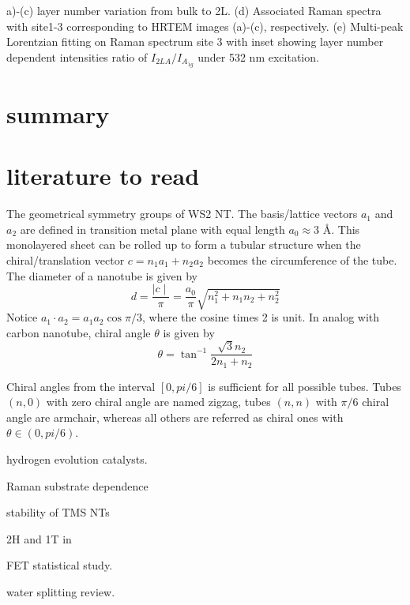 a)-(c)  layer number variation from bulk to 2L. (d) Associated Raman spectra with site1-3 corresponding to HRTEM images (a)-(c), respectively. (e) Multi-peak Lorentzian fitting on Raman spectrum site 3 with inset showing layer number dependent intensities ratio of $I_{2LA}/I_{A_{1g}}$ under 532 nm excitation.



\section{summary} 

\section{literature to read}

The geometrical symmetry groups of WS2 NT.\cite{Milosevic2000} 
The basis/lattice vectors $a_1$ and $a_2$ are defined in transition metal plane with equal length $a_0 \approx 3$ \AA. This monolayered sheet can be rolled up to form a tubular structure when the chiral/translation vector $c = n_1a_1 + n_2a_2$ becomes the circumference of the tube. The diameter of a nanotube is given by 
\begin{equation}
d = \frac{\mid c \mid}{\pi} = \frac{a_0}{\pi}\sqrt{n_1^2 + n_1n_2 + n_2^2}
\end{equation}
Notice $a_1 \cdot a_2 = a_1a_2 \cos\pi/3$, where the cosine times 2 is unit. 
In analog with carbon nanotube, chiral angle $\theta$ is given by
\begin{equation}
\theta = \tan^{-1}\frac{\sqrt{3}n_2}{2n_1 + n_2}
\end{equation}

Chiral angles from the interval $[0,pi/6]$ is sufficient for all possible tubes. Tubes $(n,0)$ with zero chiral angle are named zigzag, tubes $(n,n)$ with $\pi/6$ chiral angle are armchair, whereas all others are referred as chiral ones with $\theta \in (0,pi/6)$. 



hydrogen evolution catalysts. \cite{Merki2011}

Raman substrate dependence \cite{Buscema2013}

stability of TMS NTs \cite{Seifert2002}

2H and 1T in  \cite{Eda2012}

 FET statistical study. \cite{Liu2013i}

water splitting review. \cite{B800489G}

